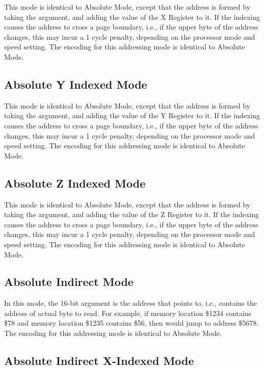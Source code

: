 This mode is identical to Absolute Mode, except that the address is formed by taking the
argument, and adding the value of the X Register to it.  If the indexing causes the address
to cross a page boundary, i.e., if the upper byte of the address changes, this may incur a
1 cycle penalty, depending on the processor mode and speed setting.
The encoding for this addressing mode is identical to Absolute Mode.

\subsection{Absolute Y Indexed Mode}

This mode is identical to Absolute Mode, except that the address is formed by taking the
argument, and adding the value of the Y Register to it.  If the indexing causes the address
to cross a page boundary, i.e., if the upper byte of the address changes, this may incur a
1 cycle penalty, depending on the processor mode and speed setting.
The encoding for this addressing mode is identical to Absolute Mode.

\subsection{Absolute Z Indexed Mode}

This mode is identical to Absolute Mode, except that the address is formed by taking the
argument, and adding the value of the Z Register to it.  If the indexing causes the address
to cross a page boundary, i.e., if the upper byte of the address changes, this may incur a
1 cycle penalty, depending on the processor mode and speed setting.
The encoding for this addressing mode is identical to Absolute Mode.

\subsection{Absolute Indirect Mode}

In this mode, the 16-bit argument is the address that points to, i.e., contains the
address of actual byte to read.  For example, if memory location \$1234 contains \$78
and memory location \$1235 contains \$56, then  would jump
to address \$5678.  The encoding for this addressing mode is identical to Absolute Mode.

\subsection{Absolute Indirect X-Indexed Mode}

